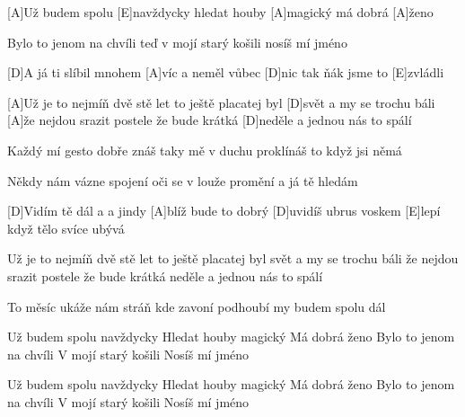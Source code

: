 

[A]Už budem spolu [E]navždycky
hledat houby [A]magický
má dobrá [A]\null ženo

Bylo to jenom na chvíli
teď v mojí starý košili
nosíš mí jméno

[D]A já ti slíbil mnohem [A]víc
a neměl vůbec [D]nic
tak ňák jsme to [E]zvládli

[A]Už je to nejmíň dvě stě let
to ještě placatej byl [D]svět
a my se trochu báli
[A]\null že nejdou srazit postele
že bude krátká [D]neděle
a jednou nás to spálí

Každý mí gesto dobře znáš
taky mě v duchu proklínáš
to když jsi němá 

Někdy nám vázne spojení
oči se v louže promění 
a já tě hledám
\slpc

[D]Vidím tě dál a a jindy [A]blíž
bude to dobrý [D]uvidíš
ubrus voskem [E]lepí 
když tělo svíce ubývá 

Už je to nejmíň dvě stě let
to ještě placatej byl svět
a my se trochu báli
že nejdou srazit postele
že bude krátká neděle
a jednou nás to spálí

To měsíc ukáže nám stráň 
kde zavoní podhoubí
my budem spolu dál

Už budem spolu navždycky 
Hledat houby magický
Má dobrá ženo
Bylo to jenom na chvíli 
V mojí starý košili 
Nosíš mí jméno

Už budem spolu navždycky 
Hledat houby magický
Má dobrá ženo
Bylo to jenom na chvíli 
V mojí starý košili 
Nosíš mí jméno


